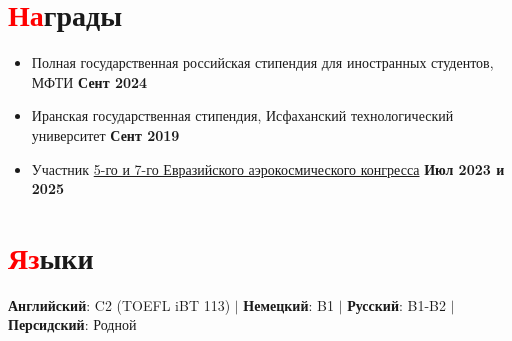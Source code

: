 \documentclass[a4paper, 10pt]{article}
\newcommand{\resumeItem}[1]{
    \item\small{
        {#1 \vspace{-2pt}}
    }
}
\begin{document}
\section{\textcolor{red}{На}грады}
\begin{itemize}
     \resumeItem{Полная государственная российская стипендия для иностранных студентов, МФТИ} \hfill \textbf{Сент 2024}
    \resumeItem{Иранская государственная стипендия, Исфаханский технологический университет} \hfill \textbf{Сент 2019}
    \resumeItem{Участник \href{https://congress.aero/en/}{5-го и 7-го Евразийского аэрокосмического конгресса}} \hfill \textbf{Июл 2023 и 2025}

\end{itemize}
\vspace{-10pt}

\section{\textcolor{red}{Яз}ыки}
\begin{center}
    \textbf{Английский}: C2 (TOEFL iBT 113) \quad $|$ \quad 
    \textbf{Немецкий}: B1 \quad $|$ \quad
    \textbf{Русский}: B1-B2 \quad $|$ \quad 
    \textbf{Персидский}: Родной 
\end{center}
\end{document}
